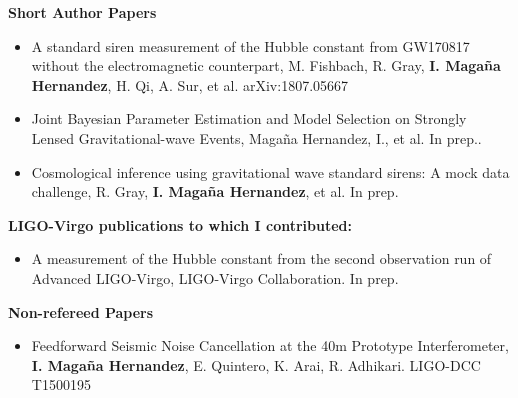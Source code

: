 \documentclass[letterpaper,10pt]{article}
\newcommand{\resheading}[1]{{\large \colorbox{mygrey}{\begin{minipage}{\textwidth}{\textbf{#1 \vphantom{p\^{E}}}}\end{minipage}}}}
\begin{document}
\resheading{Short Author Papers}
\begin{itemize}
	\item A standard siren measurement of the Hubble constant from GW170817 without the electromagnetic counterpart, M. Fishbach, R. Gray, \textbf{I. Maga\~na Hernandez}, H. Qi, A. Sur, et al. arXiv:1807.05667
    \item Joint Bayesian Parameter Estimation and Model Selection on Strongly Lensed Gravitational-wave Events, Magaña Hernandez, I., et al. In prep..
	\item Cosmological inference using gravitational wave standard sirens: A mock data challenge, R. Gray, \textbf{I. Maga\~na Hernandez}, et al. In prep.
\end{itemize}

\resheading{LIGO-Virgo publications to which I contributed:}
\begin{itemize}
	\item A measurement of the Hubble constant from the second observation run of Advanced LIGO-Virgo, LIGO-Virgo Collaboration. In prep.
\end{itemize}

\resheading{Non-refereed Papers}
\begin{itemize}
	\item Feedforward Seismic Noise Cancellation at the 40m Prototype Interferometer, \textbf{I. Maga\~na Hernandez}, E. Quintero, K. Arai, R. Adhikari. LIGO-DCC T1500195
\end{itemize}
\end{document}
